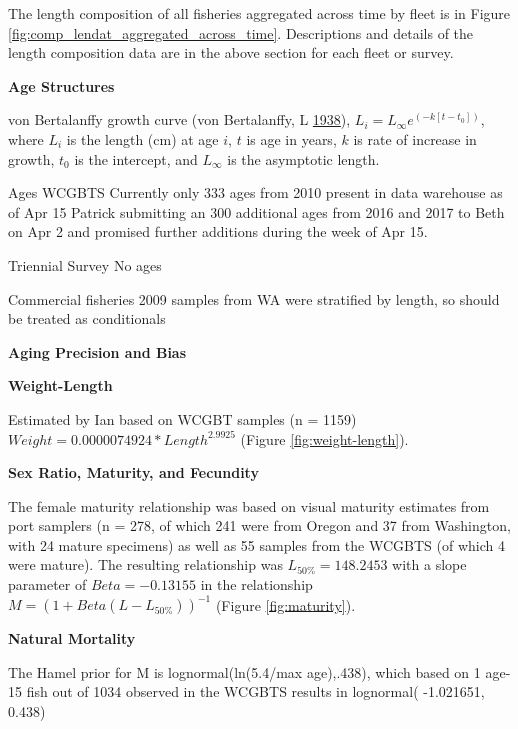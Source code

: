 \documentclass[12pt,]{article}
\begin{document}
The length composition of all fisheries aggregated across time by fleet
is in Figure \ref{fig:comp_lendat_aggregated_across_time}. Descriptions
and details of the length composition data are in the above section for
each fleet or survey.

\vspace{.5cm}

\textbf{Age Structures}

von Bertalanffy growth curve (von Bertalanffy, L
\protect\hyperlink{ref-vonBertalanffy1938}{1938}),
\(L_i = L_{\infty}e^{(-k[t-t_0])}\), where \(L_i\) is the length (cm) at
age \(i\), \(t\) is age in years, \(k\) is rate of increase in growth,
\(t_0\) is the intercept, and \(L_{\infty}\) is the asymptotic length.

Ages WCGBTS Currently only 333 ages from 2010 present in data warehouse
as of Apr 15 Patrick submitting an 300 additional ages from 2016 and
2017 to Beth on Apr 2 and promised further additions during the week of
Apr 15.

Triennial Survey No ages

Commercial fisheries 2009 samples from WA were stratified by length, so
should be treated as conditionals

\vspace{.5cm}

\textbf{Aging Precision and Bias}

\vspace{.5cm}

\textbf{Weight-Length}

Estimated by Ian based on WCGBT samples (n = 1159)
\(Weight = 0.0000074924 * Length ^ 2.9925\) (Figure
\ref{fig:weight-length}).

\vspace{.5cm}

\textbf{Sex Ratio, Maturity, and Fecundity}

The female maturity relationship was based on visual maturity estimates
from port samplers (n = 278, of which 241 were from Oregon and 37 from
Washington, with 24 mature specimens) as well as 55 samples from the
WCGBTS (of which 4 were mature). The resulting relationship was
\(L_{50\%} = 148.2453\) with a slope parameter of \(Beta = -0.13155\) in
the relationship \(M = (1 + Beta(L - L_{50\%}))^{-1}\) (Figure
\ref{fig:maturity}).

\vspace{.5cm}

\textbf{Natural Mortality}

The Hamel prior for M is lognormal(ln(5.4/max age),.438), which based on
1 age-15 fish out of 1034 observed in the WCGBTS results in lognormal(
-1.021651, 0.438)
\end{document}
